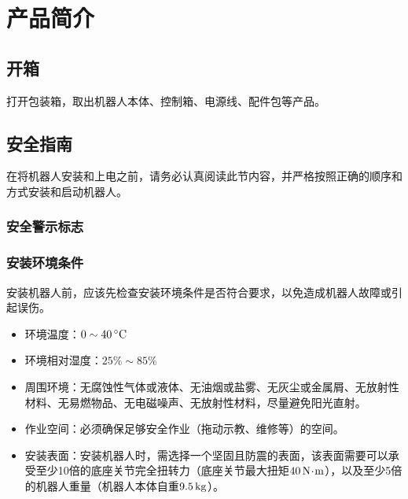 \chapter{产品简介}
\section{开箱}
打开包装箱，取出机器人本体、控制箱、电源线、配件包等产品。

\section{安全指南}
\label{sec:安全指南}
在将机器人安装和上电之前，请务必认真阅读此节内容，并严格按照正确的顺序和方式安装和启动机器人。

\subsection{安全警示标志}




\subsection{安装环境条件}
安装机器人前，应该先检查安装环境条件是否符合要求，以免造成机器人故障或引起误伤。

\begin{itemize}
\item 环境温度：$0\sim 40\,\mathrm{^\circ C}$
\item 环境相对湿度：$25\%\sim 85\%$
\item 周围环境：无腐蚀性气体或液体、无油烟或盐雾、无灰尘或金属屑、无放射性材料、无易燃物品、无电磁噪声、无放射性材料，尽量避免阳光直射。
\item 作业空间：必须确保足够安全作业（拖动示教、维修等）的空间。
\item 安装表面：安装机器人时，需选择一个坚固且防震的表面，该表面需要可以承受至少10倍的底座关节完全扭转力（底座关节最大扭矩$40 \,\mathrm{N\!\cdot\! m}$），以及至少5倍的机器人重量（机器人本体自重$9.5 \,\mathrm{kg}$）。
\end{itemize}


